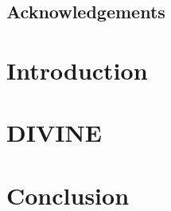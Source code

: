 \documentclass[11pt,twoside,a4paper]{book} %
\newcommand{\divine}{\mbox{\textsf{DIVINE}}}
\newcommand{\Jirik}{doc. RNDr. Jiří Barnat, Ph.D.}
\newcommand{\Mornfall}{RNDr. Petr Ročkai, Ph.D.}
\begin{document}
\cleardoublepage

\section*{Acknowledgements}
% 

\cleardoublepage
\thispagestyle{empty}

\pagestyle{headings}
\tableofcontents %
\mainmatter


\chapter{Introduction}\label{chap:introduction}


\chapter{\divine}


\chapter{Conclusion}


\printbibliography
\end{document}
